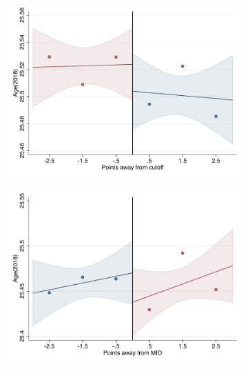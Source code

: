 \documentclass[oneside,11pt]{article}
\begin{document}
\begin{figure}[H]

    \caption{RD plots for balance variables across those assigned to UNAM high-school, and those who are not\label{fig:Balance_rd_plot_UNAM_1}}
    \begin{center}
    
    \begin{subfigure}{0.475\textwidth}
        \centering
        \includegraphics[width=\textwidth]{04_Figures/rd_plot_tau_age2018_UNAM3.pdf}
    \end{subfigure}
    \begin{subfigure}{0.475\textwidth}
        \centering
        \includegraphics[width=\textwidth]{04_Figures/rd_plot_mid_age2018_UNAM3.pdf}
    \end{subfigure}


\end{center}
\end{figure}
\end{document}
